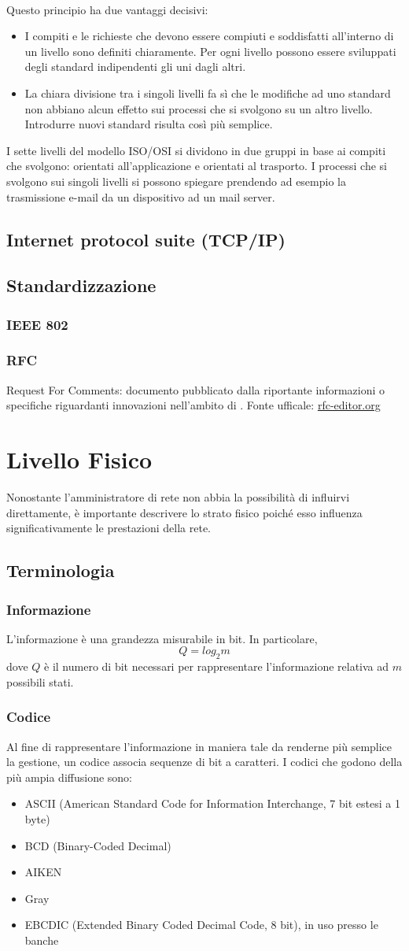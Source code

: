 \documentclass[a4paper,11pt]{article}
\def\sec#1{\section{#1}\label{#1}}
\def\sub#1{\subsection{#1}\label{#1}}
\def\subsub#1{\subsubsection{#1}\label{#1}}
\def\vedi#1{\nameref{#1}}
\begin{document}
\\Questo principio ha due vantaggi decisivi:
\begin{itemize}
	\item I compiti e le richieste che devono essere compiuti e soddisfatti all’interno di un livello sono definiti chiaramente. Per ogni livello possono essere sviluppati degli standard indipendenti gli uni dagli altri.
	\item La chiara divisione tra i singoli livelli fa sì che le modifiche ad uno standard non abbiano alcun effetto sui processi che si svolgono su un altro livello. Introdurre nuovi standard risulta così più semplice.
\end{itemize}
I sette livelli del modello ISO/OSI si dividono in due gruppi in base ai compiti che svolgono: orientati all’applicazione e orientati al trasporto. I processi che si svolgono sui singoli livelli si possono spiegare prendendo ad esempio la trasmissione e-mail da un dispositivo ad un mail server.

\sub{Internet protocol suite (TCP/IP)}


\sub{Standardizzazione}
\subsub{IEEE 802}
\subsub{RFC}
Request For Comments: documento pubblicato dalla \vedi{IETF} riportante informazioni o specifiche riguardanti innovazioni nell'ambito di \vedi{Internet}. Fonte ufficale: \url{rfc-editor.org}
\newpage

\sec{Livello Fisico}
Nonostante l'amministratore di rete non abbia la possibilità di influirvi direttamente, è importante descrivere lo strato fisico poiché esso influenza significativamente le prestazioni della rete.

\subsection{Terminologia}
\subsub{Informazione} 
L'informazione è una grandezza misurabile in bit. In particolare, \[Q=log_{2}m\] dove $Q$ è il numero di bit necessari per rappresentare l'informazione relativa ad $m$ possibili stati.

\subsub{Codice}
Al fine di rappresentare l'informazione in maniera tale da renderne più semplice la gestione, un codice associa sequenze di bit a caratteri. I codici che godono della più ampia diffusione sono:
\begin{itemize}
\item ASCII (American Standard Code for Information Interchange, 7 bit estesi a 1 byte)
\item BCD (Binary-Coded Decimal)
\item AIKEN 
\item Gray
\item EBCDIC (Extended Binary Coded Decimal Code, 8 bit), in uso presso le banche
\end{itemize}
\end{document}
